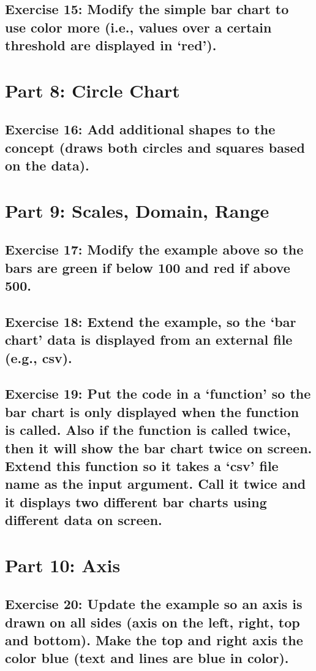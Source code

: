 \documentclass[11pt]{article}   	%
\begin{document}
\subsection{Exercise 15: Modify the simple bar chart to use color more (i.e., values over a certain threshold are displayed in ‘red’).}

\section{Part 8: Circle Chart}
\subsection{Exercise 16: Add additional shapes to the concept (draws both circles and squares based on the data).}

\section{Part 9: Scales, Domain, Range}
\subsection{Exercise 17: Modify the example above so the bars are green if below 100 and red if above 500.}
\subsection{Exercise 18: Extend the example, so the ‘bar chart’ data is displayed from an external file (e.g., csv).}
\subsection{Exercise 19: Put the code in a ‘function’ so the bar chart is only displayed when the function is called. Also if the function is called twice, then it will show the bar chart twice on screen. Extend this function so it takes a ‘csv’ file name as the input argument. Call it twice and it displays two different bar charts using different data on screen.}

\section{Part 10: Axis}
\subsection{Exercise 20: Update the example so an axis is drawn on all sides (axis on the left, right, top and bottom). Make the top and right axis the color blue (text and lines are blue in color).}
\end{document}
